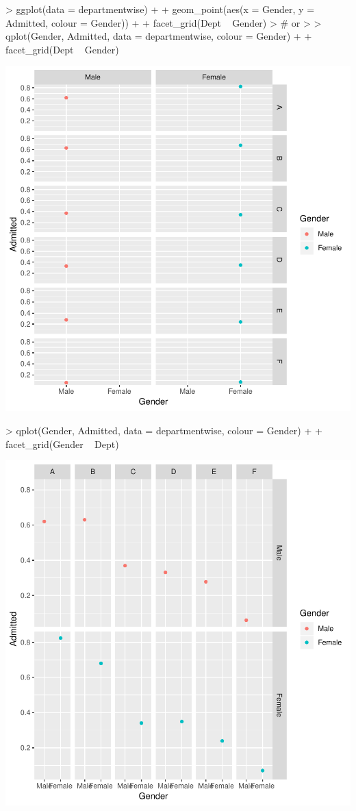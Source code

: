 \documentclass[12pt,letterpaper,final]{article}
\begin{document}
\begin{Schunk}
\begin{Sinput}
> ggplot(data = departmentwise) +
+   geom_point(aes(x = Gender, y = Admitted, colour = Gender)) +
+   facet_grid(Dept ~ Gender)
> # or
> 
> qplot(Gender, Admitted, data = departmentwise, colour = Gender) +
+   facet_grid(Dept ~ Gender)
\end{Sinput}
\end{Schunk}
\includegraphics{lect_main-034}

\begin{Schunk}
\begin{Sinput}
> qplot(Gender, Admitted, data = departmentwise, colour = Gender) +
+   facet_grid(Gender ~ Dept)
\end{Sinput}
\end{Schunk}
\includegraphics{lect_main-035}
\end{document}
